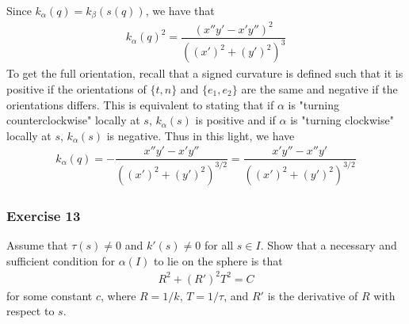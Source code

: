 \documentclass{article}
\begin{document}
	Since $k_{\alpha}(q) = k_{\beta}(s(q))$, we have that
	\begin{gather*}
		k_{\alpha}(q)^2 = \dfrac{ \left( x'' y' - x' y'' \right)^2 }{ \left( \left( x' \right)^2 + \left( y' \right)^2 \right)^3 }
	\end{gather*}
	To get the full orientation, recall that a signed curvature is defined such that it is positive if the orientations of $\{ t, n \}$ and $\{ e_1, e_2 \}$ are the same and negative if the orientations differs. This is equivalent to stating that if $\alpha$ is "turning counterclockwise" locally at $s$, $k_{\alpha}(s)$ is positive and if $\alpha$ is "turning clockwise" locally at $s$, $k_{\alpha}(s)$ is negative. Thus in this light, we have
	\begin{gather*}
		k_{\alpha}(q) = -\dfrac{ x'' y' - x' y'' }{ \left( \left( x' \right)^2 + \left( y' \right)^2 \right)^{3/2} }
		= \dfrac{ x' y'' - x'' y' }{ \left( \left( x' \right)^2 + \left( y' \right)^2 \right)^{3/2} }
	\end{gather*}

	\subsubsection*{Exercise 13}
	Assume that $\tau(s) \neq 0$ and $k'(s) \neq 0$ for all $s \in I$. Show that a necessary and sufficient condition for $\alpha(I)$ to lie on the sphere is that
	\begin{gather*}
		R^2 + (R')^2T^2 = C
	\end{gather*}
	for some constant $c$, where $R = 1/k$, $T = 1/\tau$, and $R'$ is the derivative of $R$ with respect to $s$.
	
\end{document}
